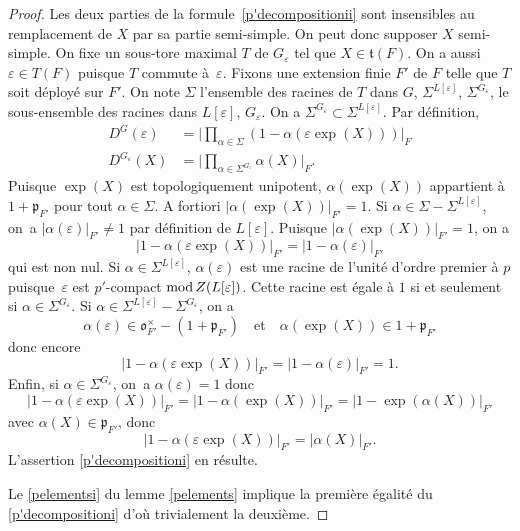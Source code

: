\documentclass[JEP,XML,SOM,Unicode,francais]{cedram}
\let\epsilon\varepsilon
\newcommand{\quadet}{\quad\text{et}\quad}
\newcommand{\rmod}{\textup{mod}\,}
\newcommand{\fro}{\mathfrak{o}}
\newcommand{\frp}{\mathfrak{p}}
\newcommand{\frt}{\mathfrak{t}}
\theoremstyle{plain}
\theoremstyle{definition}
\begin{document}
\begin{proof}
Les deux parties de la formule~\eqref{p'decompositionii} sont insensibles au remplacement de $X$ par sa partie semi-simple. On peut donc supposer $X$ semi-simple. On fixe un sous-tore maximal $T$ de $G_{\epsilon}$ tel que $X\in \frt(F)$. On a aussi $\epsilon\in T(F)$ puisque $T$ commute à~$\epsilon$. Fixons une extension finie $F'$ de $F$ telle que $T$ soit déployé sur $F'$. On note $\Sigma$ l'ensemble des racines de $T$ dans $G$, $\Sigma^{L[\epsilon]}$, \resp $\Sigma^{G_{\epsilon}}$, le sous-ensemble des racines dans $L[\epsilon]$, \resp $G_{\epsilon}$. On a $\Sigma^{G_{\epsilon}}\subset \Sigma^{L[\epsilon]}$. Par définition,
\begin{align*}
D^G(\epsilon)&=\bigl\vert \textstyle\prod_{\alpha\in \Sigma}(1-\alpha(\epsilon \exp(X)))\bigr\vert _{F}
\\
D^{G_{\epsilon}}(X)&=\bigl\vert \textstyle\prod_{\alpha\in \Sigma^{G_{\epsilon}}}\alpha(X)\bigr\vert _{F}.
\end{align*}
Puisque $\exp(X)$ est topologiquement unipotent, $\alpha(\exp(X))$ appartient à $1+\frp_{F'}$ pour tout $\alpha\in \Sigma$. A fortiori $\vert \alpha(\exp(X))\vert _{F'}=1$.
Si $\alpha\in \Sigma-\Sigma^{L[\epsilon]}$, on~a $\vert \alpha(\epsilon)\vert _{F'}\neq1$ par définition de $L[\epsilon]$. Puisque $\vert \alpha(\exp(X))\vert _{F'}=1$, on a
\[
\vert 1-\alpha(\epsilon \exp(X))\vert _{F'}=\vert 1-\alpha(\epsilon)\vert _{F'}
\]
qui est non nul. Si $\alpha\in \Sigma^{L[\epsilon]}$, $\alpha(\epsilon)$ est une racine de l'unité d'ordre premier à $p$ puisque~$\epsilon$ est $p'$-compact $\rmod Z(L[\epsilon])$. Cette racine est égale à $1$ si et seulement si $\alpha\in \Sigma^{G_{\epsilon}}$. Si $\alpha\in \Sigma^{L[\epsilon]}-\Sigma^{G_{\epsilon}}$, on a
\[
\alpha(\epsilon)\in \fro_{F'}^{\times}-(1+\frp_{F'})\quadet\alpha(\exp(X))\in 1+\frp_{F'}
\]
donc encore
\[
\vert 1-\alpha(\epsilon \exp(X))\vert _{F'}=\vert 1-\alpha(\epsilon)\vert _{F'}=1.
\]
Enfin, si $\alpha\in \Sigma^{G_{\epsilon}}$, on~a $\alpha(\epsilon)=1$ donc
\[
\vert 1-\alpha (\epsilon \exp(X))\vert _{F'}=\vert 1-\alpha(\exp(X))\vert _{F'}=\vert 1-\exp(\alpha(X))\vert _{F'}
\]
avec $\alpha(X)\in \frp_{F'}$, donc
\[
\vert 1-\alpha (\epsilon \exp(X))\vert _{F'}=\vert \alpha(X)\vert _{F'}.
\]
L'assertion \eqref{p'decompositioni} en résulte.

Le \eqref{pelementsi} du lemme \ref{pelements} implique la première égalité du \eqref{p'decompositioni} d'où trivialement la deuxième.


\end{proof}
\end{document}
